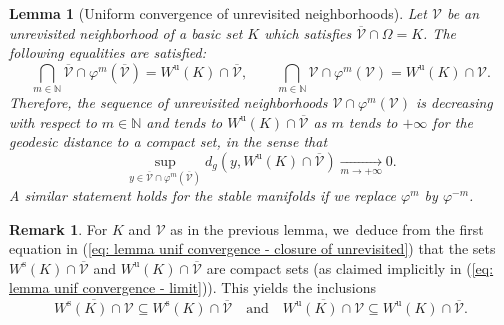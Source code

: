 \documentclass[JEP,XML,SOM,Unicode,NoEqCountersInSection,NoFloatCountersInSection,published]{cedram}
\newcommand{\rs}{\mathrm{s}}
\newcommand{\ru}{\mathrm{u}}
\theoremstyle{definition}
\newtheorem{remark}[definition]{Remark}
\theoremstyle{plain}
\newtheorem{lemma}[definition]{Lemma}
\newcommand{\N}{\mathbb{N}}
\newcommand{\Vcal}{\mathcal{V}}
\begin{document}
\begin{lemma}[Uniform convergence of unrevisited neighborhoods]\label{lemme: cv nonrevisite vers variete stable et instable}
Let $\Vcal$ be an unrevisited neighborhood of a basic set $K$ which satisfies $\overline{\Vcal} \cap \Omega = K$. The following equalities are satisfied:
\begin{equation}\label{eq: lemma unif convergence - closure of unrevisited}
\bigcap_{m \in \N} \overline{\Vcal} \cap \varphi^m (\overline{\Vcal}) = W^\ru (K) \cap \overline{\Vcal}, \qquad \bigcap_{m \in \N} \Vcal \cap \varphi^m (\Vcal) = W^\ru (K) \cap \Vcal.
\end{equation}
Therefore, the sequence of unrevisited neighborhoods $\Vcal \cap \varphi^m (\Vcal)$ is decreasing with respect to $m \in \N$ and tends to $W^\ru (K) \cap \overline{\Vcal}$ as $m$ tends to $+ \infty$ for the geodesic distance to a compact set, in the sense that
\begin{equation}\label{eq: lemma unif convergence - limit}
\sup_{y \in \overline{\Vcal} \cap \varphi^{m} (\overline{\Vcal})} d_g \left(y, W^{\ru} (K) \cap \overline{\Vcal} \right) \underset{m \to + \infty}{\to} 0.
\end{equation}
A similar statement holds for the stable manifolds if we replace $\varphi^{m}$ by $\varphi^{-m}$.
\end{lemma}

\begin{remark}\label{lemma: clos. of stable man on unrevisited neigh.}
For $K$ and $\Vcal$ as in the previous lemma, we~deduce from the first equation in (\ref{eq: lemma unif convergence - closure of unrevisited}) that the sets $ W^\rs (K) \cap \overline{\Vcal} $ and $W^\ru (K) \cap \overline{\Vcal} $ are compact sets (as claimed implicitly in (\ref{eq: lemma unif convergence - limit})). This yields the inclusions
\[
\overline{W^\rs (K) \cap \Vcal} \subseteq W^\rs (K) \cap \overline{\Vcal} \quad \text{and} \quad \overline{W^\ru (K) \cap \Vcal} \subseteq W^\ru (K) \cap \overline{\Vcal}.
\]
\end{remark}
\end{document}
